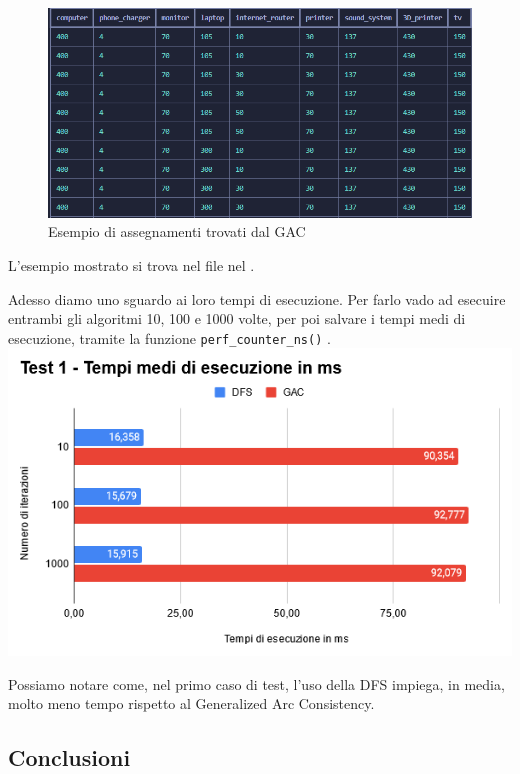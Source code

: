 \documentclass[12pt, letterpaper]{article}
\begin{document}
\begin{figure}[h]
      \centering
      \includegraphics[scale=0.65]{assegnamenti-gac.png}
      \caption{Esempio di assegnamenti trovati dal GAC}
\end{figure}


\break

L'esempio mostrato si trova nel file nel . \\ \break

\noindent Adesso diamo uno sguardo ai loro tempi di esecuzione. Per farlo vado ad esecuire
entrambi gli algoritmi 10, 100 e 1000 volte, per poi salvare i tempi medi di esecuzione, tramite
la funzione \lstinline|perf_counter_ns()| \cite{perf_counter_ns_docs}. \\

\includegraphics[scale=0.8]{test-1-performance.png}

\noindent Possiamo notare come, nel primo caso di test, l'uso della DFS impiega, in media, molto meno
tempo rispetto al Generalized Arc Consistency.

\subsection{Conclusioni}
\end{document}
